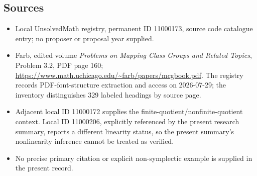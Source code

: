 \documentclass[11pt]{article}
\begin{document}
\subsection{Sources}
\begin{itemize}
\item Local UnsolvedMath registry, permanent ID 11000173, source code catalogue entry; no proposer or proposal year supplied.
\item Farb, edited volume \emph{Problems on Mapping Class Groups and Related Topics}, Problem 3.2, PDF page 160; \url{https://www.math.uchicago.edu/~farb/papers/mcgbook.pdf}. The registry records PDF-font-structure extraction and access on 2026-07-29; the inventory distinguishes 329 labeled headings by source page.
\item Adjacent local ID 11000172 supplies the finite-quotient/nonfinite-quotient context. Local ID 11000206, explicitly referenced by the present research summary, reports a different linearity status, so the present summary's nonlinearity inference cannot be treated as verified.
\item No precise primary citation or explicit non-symplectic example is supplied in the present record.
\end{itemize}
\end{document}
